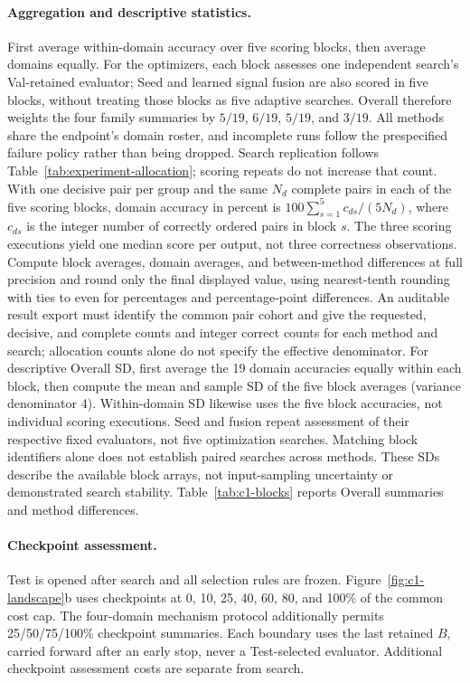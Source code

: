 \paragraph{Aggregation and descriptive statistics.}
First average within-domain accuracy over five scoring blocks, then average domains equally.
For the optimizers, each block assesses one independent search's Val-retained evaluator; Seed and learned signal fusion are also scored in five blocks, without treating those blocks as five adaptive searches.
Overall therefore weights the four family summaries by $5/19$, $6/19$, $5/19$, and $3/19$.
All methods share the endpoint's domain roster, and incomplete runs follow the prespecified failure policy rather than being dropped.
Search replication follows Table~\ref{tab:experiment-allocation}; scoring repeats do not increase that count.
With one decisive pair per group and the same $N_d$ complete pairs in each of the five scoring blocks, domain accuracy in percent is $100\sum_{s=1}^{5}c_{ds}/(5N_d)$, where $c_{ds}$ is the integer number of correctly ordered pairs in block $s$.
The three scoring executions yield one median score per output, not three correctness observations.
Compute block averages, domain averages, and between-method differences at full precision and round only the final displayed value, using nearest-tenth rounding with ties to even for percentages and percentage-point differences.
An auditable result export must identify the common pair cohort and give the requested, decisive, and complete counts and integer correct counts for each method and search; allocation counts alone do not specify the effective denominator.
For descriptive Overall SD, first average the 19 domain accuracies equally within each block, then compute the mean and sample SD of the five block averages (variance denominator 4).
Within-domain SD likewise uses the five block accuracies, not individual scoring executions.
Seed and fusion repeat assessment of their respective fixed evaluators, not five optimization searches.
Matching block identifiers alone does not establish paired searches across methods.
These SDs describe the available block arrays, not input-sampling uncertainty or demonstrated search stability.
Table~\ref{tab:c1-blocks} reports Overall summaries and method differences.

\paragraph{Checkpoint assessment.}
Test is opened after search and all selection rules are frozen.
Figure~\ref{fig:c1-landscape}b uses checkpoints at 0, 10, 25, 40, 60, 80, and 100\% of the common cost cap.
The four-domain mechanism protocol additionally permits 25/50/75/100\% checkpoint summaries.
Each boundary uses the last retained $B$, carried forward after an early stop, never a Test-selected evaluator.
Additional checkpoint assessment costs are separate from search.

